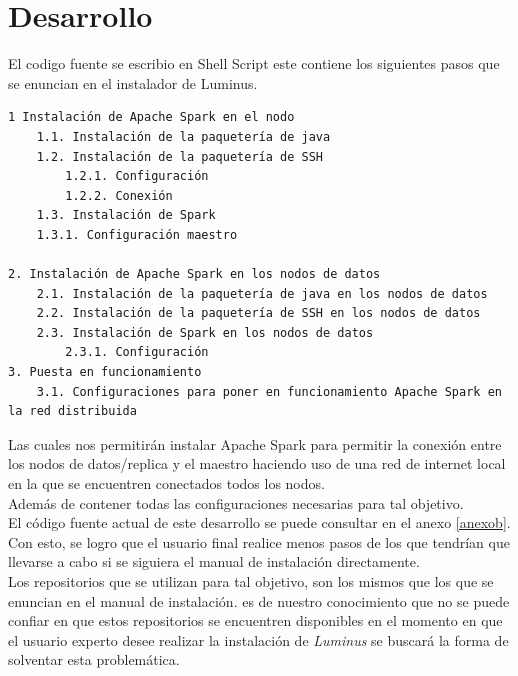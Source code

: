 \section{Desarrollo}
El codigo fuente se escribio en Shell Script este contiene los siguientes pasos que se enuncian en el instalador de Luminus.
\begin{verbatim}
1 Instalación de Apache Spark en el nodo
	1.1. Instalación de la paquetería de java 
	1.2. Instalación de la paquetería de SSH	
		1.2.1. Configuración
		1.2.2. Conexión
	1.3. Instalación de Spark
	1.3.1. Configuración maestro

2. Instalación de Apache Spark en los nodos de datos
	2.1. Instalación de la paquetería de java en los nodos de datos
	2.2. Instalación de la paquetería de SSH en los nodos de datos
	2.3. Instalación de Spark en los nodos de datos
		2.3.1. Configuración 
3. Puesta en funcionamiento
	3.1. Configuraciones para poner en funcionamiento Apache Spark en la red distribuida
\end{verbatim}
Las cuales nos permitirán instalar Apache Spark para permitir la conexión entre los nodos de datos/replica y el maestro haciendo uso de una red de internet local en la que se encuentren conectados todos los nodos.
\\
Además de contener todas las configuraciones necesarias para tal objetivo.  
\\
El código fuente actual de este desarrollo se puede consultar en el anexo \ref{anexob}.
\\
Con esto, se logro que el usuario final realice menos pasos de los que tendrían que llevarse a cabo si se siguiera el manual de instalación directamente. 
\\
Los repositorios que se utilizan para tal objetivo, son los mismos que los que se enuncian en el manual de instalación. es de nuestro conocimiento que no se puede confiar en que estos repositorios se encuentren disponibles en el momento en que el usuario experto desee realizar la instalación de \emph{Luminus} se buscará la forma de solventar esta problemática.
